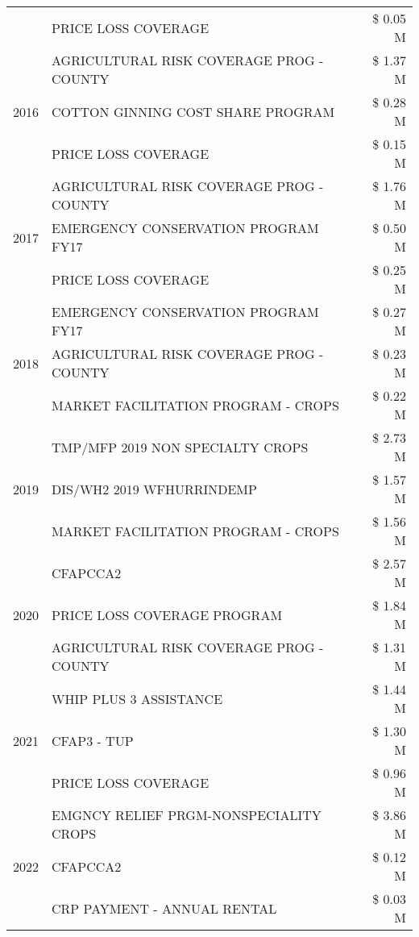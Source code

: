 \begin{tabular}{llr}
 & PRICE LOSS COVERAGE & \$ 0.05 M \\
\cline{1-3}
\multirow[t]{3}{*}{2016} & AGRICULTURAL RISK COVERAGE PROG - COUNTY & \$ 1.37 M \\
 & COTTON GINNING COST SHARE PROGRAM & \$ 0.28 M \\
 & PRICE LOSS COVERAGE & \$ 0.15 M \\
\cline{1-3}
\multirow[t]{3}{*}{2017} & AGRICULTURAL RISK COVERAGE PROG - COUNTY & \$ 1.76 M \\
 & EMERGENCY CONSERVATION PROGRAM FY17 & \$ 0.50 M \\
 & PRICE LOSS COVERAGE & \$ 0.25 M \\
\cline{1-3}
\multirow[t]{3}{*}{2018} & EMERGENCY CONSERVATION PROGRAM FY17 & \$ 0.27 M \\
 & AGRICULTURAL RISK COVERAGE PROG - COUNTY & \$ 0.23 M \\
 & MARKET FACILITATION PROGRAM - CROPS & \$ 0.22 M \\
\cline{1-3}
\multirow[t]{3}{*}{2019} & TMP/MFP 2019 NON SPECIALTY CROPS & \$ 2.73 M \\
 & DIS/WH2 2019 WFHURRINDEMP & \$ 1.57 M \\
 & MARKET FACILITATION PROGRAM - CROPS & \$ 1.56 M \\
\cline{1-3}
\multirow[t]{3}{*}{2020} & CFAPCCA2 & \$ 2.57 M \\
 & PRICE LOSS COVERAGE PROGRAM & \$ 1.84 M \\
 & AGRICULTURAL RISK COVERAGE PROG - COUNTY & \$ 1.31 M \\
\cline{1-3}
\multirow[t]{3}{*}{2021} & WHIP PLUS 3 ASSISTANCE & \$ 1.44 M \\
 & CFAP3 - TUP & \$ 1.30 M \\
 & PRICE LOSS COVERAGE & \$ 0.96 M \\
\cline{1-3}
\multirow[t]{3}{*}{2022} & EMGNCY RELIEF PRGM-NONSPECIALITY CROPS & \$ 3.86 M \\
 & CFAPCCA2 & \$ 0.12 M \\
 & CRP PAYMENT - ANNUAL RENTAL & \$ 0.03 M \\
\cline{1-3}
\bottomrule
\end{tabular}
